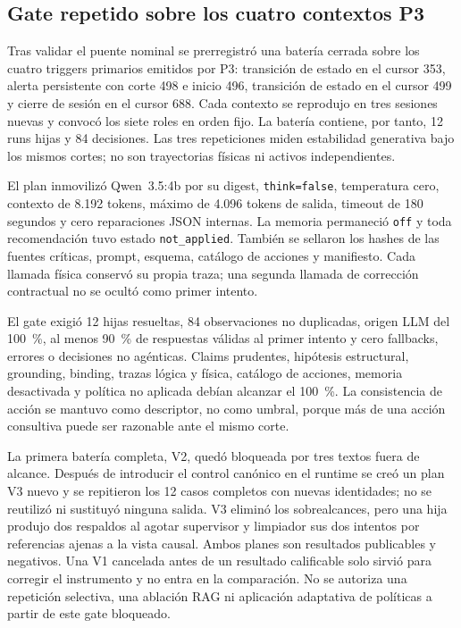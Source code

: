 \subsection{Gate repetido sobre los cuatro contextos P3}

Tras validar el puente nominal se prerregistró una batería cerrada sobre los
cuatro triggers primarios emitidos por P3: transición de estado en el cursor
353, alerta persistente con corte 498 e inicio 496, transición de estado en el
cursor 499 y cierre de sesión en el cursor 688. Cada contexto se reprodujo en
tres sesiones nuevas y convocó los siete roles en orden fijo. La batería
contiene, por tanto, 12 runs hijas y 84 decisiones. Las tres repeticiones miden
estabilidad generativa bajo los mismos cortes; no son trayectorias físicas ni
activos independientes.

El plan inmovilizó Qwen~3.5:4b por su digest, \texttt{think=false}, temperatura
cero, contexto de 8.192 tokens, máximo de 4.096 tokens de salida, timeout de 180
segundos y cero reparaciones JSON internas. La memoria permaneció
\texttt{off} y toda recomendación tuvo estado \texttt{not\_applied}. También se
sellaron los hashes de las fuentes críticas, prompt, esquema, catálogo de
acciones y manifiesto. Cada llamada física conservó su propia traza; una
segunda llamada de corrección contractual no se ocultó como primer intento.

El gate exigió 12 hijas resueltas, 84 observaciones no duplicadas, origen LLM
del 100~\%, al menos 90~\% de respuestas válidas al primer intento y cero
fallbacks, errores o decisiones no agénticas. Claims prudentes, hipótesis
estructural, grounding, binding, trazas lógica y física, catálogo de acciones,
memoria desactivada y política no aplicada debían alcanzar el 100~\%. La
consistencia de acción se mantuvo como descriptor, no como umbral, porque más de
una acción consultiva puede ser razonable ante el mismo corte.

La primera batería completa, V2, quedó bloqueada por tres textos fuera de
alcance. Después de introducir el control canónico en el runtime se creó un plan
V3 nuevo y se repitieron los 12 casos completos con nuevas identidades; no se
reutilizó ni sustituyó ninguna salida. V3 eliminó los sobrealcances, pero una
hija produjo dos respaldos al agotar supervisor y limpiador sus dos intentos por
referencias ajenas a la vista causal. Ambos planes son resultados publicables y
negativos. Una V1 cancelada antes de un resultado calificable solo sirvió para
corregir el instrumento y no entra en la comparación. No se autoriza una
repetición selectiva, una ablación RAG ni aplicación adaptativa de políticas a
partir de este gate bloqueado.

